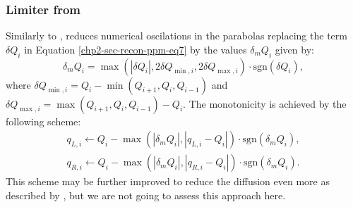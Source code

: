 \subsubsection{Limiter from \citet{lin:2004}}
	Similarly to \citet{colella:1984}, \citet{lin:2004} reduces numerical oscilations in the parabolas
replacing the term $\delta Q_i$ in Equation \eqref{chp2-sec-recon-ppm-eq7} by the values $\delta_m Q_i$ given by:
\begin{equation}
	\label{chp2-sec-mono-eq4}
	\delta_m Q_{i} =
	\max(|\delta Q_i|,2\delta Q_{\min,i},2\delta Q_{\max,i}) \cdot \text{sgn}(\delta Q_i), 
\end{equation}
where $\delta Q_{\min,i} = Q_i - \min(Q_{i+1},Q_i,Q_{i-1})$ and
$\delta Q_{\max,i} = \max(Q_{i+1},Q_i,Q_{i-1}) - Q_i$.
The monotonicity is achieved by the following scheme:	
\begin{align}
	\label{chp2-sec-mono-eq5}
	q_{L,i} \leftarrow Q_i - \max(|\delta_m Q_i|,|q_{L,i}-Q_i|) \cdot \text{sgn}(\delta_m Q_i),\\ 
	q_{R,i} \leftarrow Q_i - \max(|\delta_m Q_i|,|q_{R,i}-Q_i|) \cdot \text{sgn}(\delta_m Q_i). 
\end{align}
This scheme may be further improved to reduce the diffusion even more as described by \citet{lin:2004}, but
we are not going to assess this approach here.

